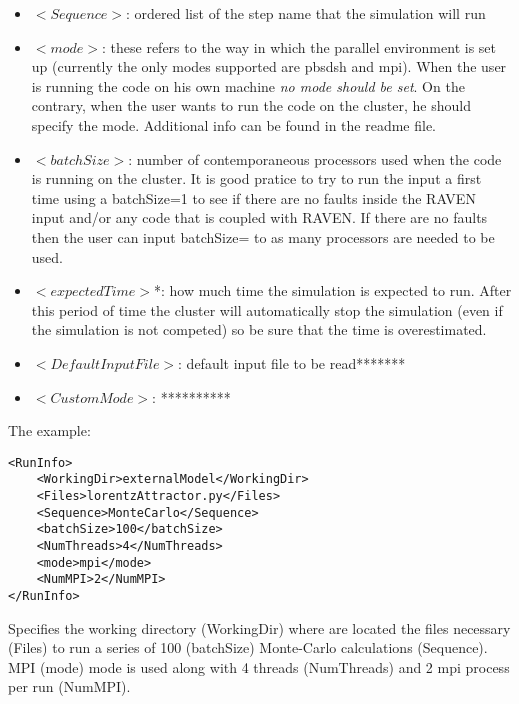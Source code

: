 \begin{itemize}
\item $<Sequence>$: ordered list of the step name that the simulation will run
\item $<mode>$: these refers to the way in which the parallel environment is set up (currently the only modes supported are pbsdsh and mpi). When the user is running the code on his own machine \textit{no mode should be set}. On the contrary, when the user wants to run the code on the cluster, he should specify the mode. Additional info can be found in the readme file. 
\item $<batchSize>$: number of contemporaneous processors used when the code is running on the cluster. It is good pratice to try to run the input a first time using a batchSize=1 to see if there are no faults inside the RAVEN input and/or any code that is coupled with RAVEN. If there are no faults then the user can input batchSize= to as many processors are needed to be used.
\item $<expectedTime>$*: how much time the simulation is expected to run. After this period of time the cluster will automatically stop the simulation (even if the simulation is not competed) so be sure that the time is overestimated.
\item $<DefaultInputFile>$: default input file to be read*******
\item $<CustomMode>$: **********
\end{itemize}

The example:
\begin{lstlisting}[style=XML]
<RunInfo>
    <WorkingDir>externalModel</WorkingDir>
    <Files>lorentzAttractor.py</Files>
    <Sequence>MonteCarlo</Sequence>
    <batchSize>100</batchSize>
    <NumThreads>4</NumThreads>    
    <mode>mpi</mode>
    <NumMPI>2</NumMPI>
</RunInfo>
\end{lstlisting}
Specifies the working directory (WorkingDir) where are located the files necessary (Files) to run a series of 100 (batchSize) Monte-Carlo calculations (Sequence).
MPI (mode) mode is used along with 4 threads (NumThreads) and 2 mpi process per run (NumMPI).
